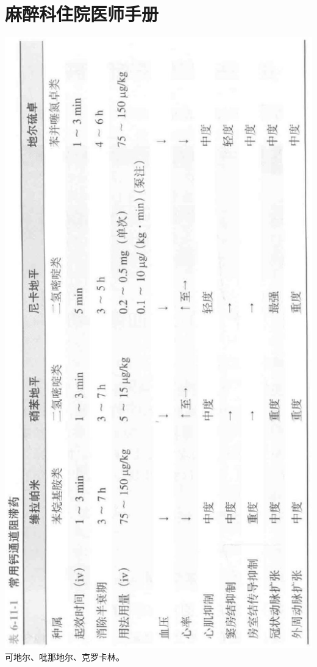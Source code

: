 \documentclass[10pt]{article}
\begin{document}
\section*{麻醉科住院医师手册}
\includegraphics[max width=\textwidth, center]{2024_07_05_645bb794a4d4f32ee0c8g-348}\\
可地尔、吡那地尔、克罗卡林。
\end{document}
